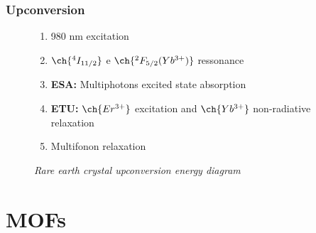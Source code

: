 \documentclass[aspectratio=169,fleqn,table]{beamer}
\begin{document}
\begingroup
{}
\begin{frame}
\frametitle{Upconversion}
  
\begin{figure}
\centering
\begin{minipage}[border=15pt]{0.5\textwidth}
	\centering
	\vspace{-185pt}
	\begin{enumerate}
		\item
		980 nm excitation
		\item
		$\ch{^4I_{11/2}}$ e $\ch{^2F_{5/2}(Yb^{3+})}$ ressonance
		\item
		\textbf{ESA:} Multiphotons excited state absorption
		\item
		\textbf{ETU:} $\ch{Er^{3+}}$ excitation and $\ch{Yb^{3+}}$ non-radiative relaxation
		\item
		Multifonon relaxation
	\end{enumerate}
\end{minipage}
\hfill
\begin{minipage}[b]{0.4\textwidth}
	\centering
	\vspace{-35pt}
    \vspace{-6pt}
    \caption{%
    \textit{Rare earth crystal upconversion energy diagram}}
\end{minipage}
\end{figure}

\end{frame}
\endgroup




\section{MOFs}
\end{document}
